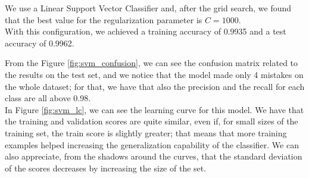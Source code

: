 We use a Linear Support Vector Classifier and, after the grid search, we found that the best value for the regularization parameter is $C=1000$.\\
With this configuration, we achieved a training accuracy of 0.9935 and a test accuracy of 0.9962.

From the Figure \ref{fig:svm_confusion}, we can see the confusion matrix related to the results on the test set, and we notice that the model made only 4 mistakes on the whole dataset; for that, we have that also the precision and the recall for each class are all above 0.98.\\
In Figure \ref{fig:svm_lc}, we can see the learning curve for this model. We have that the training and validation scores are quite similar, even if, for small sizes of the training set, the train score is slightly greater; that means that more training examples helped increasing the generalization capability of the classifier.   
We can also appreciate, from the shadows around the curves, that the standard deviation of the scores decreases by increasing the size of the set.

\pagebreak

